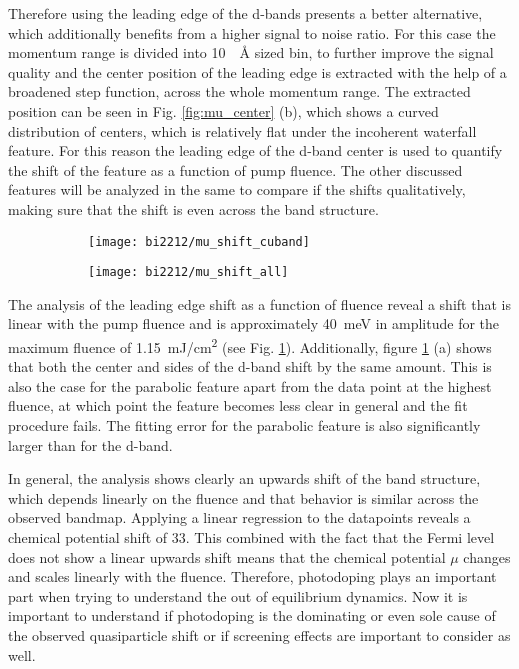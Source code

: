 Therefore using the leading edge of the  d-bands presents a better alternative, which additionally benefits from a higher signal to noise ratio.
For this case the momentum range is divided into \qty{10}{\per\angstrom} sized bin, to further improve the signal quality and the center position of the leading edge is extracted with the help of a broadened step function, across the whole momentum range.
The extracted position can be seen in Fig. \ref{fig:mu_center} (b), which shows a curved distribution of centers, which is relatively flat under the incoherent waterfall feature.
For this reason the leading edge of the  d-band center is used to quantify the shift of the feature as a function of pump fluence.
The other discussed features will be analyzed in the same to compare if the shifts qualitatively, making sure that the shift is even across the band structure.

\begin{figure}[b!]
	\centering
	\begin{subfigure}[b]{0.33\textwidth}
		\texttt{[image: bi2212/mu\_shift\_cuband]}
		\caption{}
	\end{subfigure}
	\begin{subfigure}[b]{0.33\textwidth}
		\texttt{[image: bi2212/mu\_shift\_all]}
		\caption{}
	\end{subfigure}
	\caption{}
	\label{fig:mu_shift}
\end{figure}

The analysis of the leading edge shift as a function of fluence reveal a shift that is linear with the pump fluence and is approximately \qty{40}{\milli\electronvolt} in amplitude for the maximum fluence of \qty{1.15}{\milli\joule/\centi\meter\squared} (see Fig. \ref{fig:mu_shift}).
Additionally, figure \ref{fig:mu_shift} (a) shows that both the center and sides of the  d-band shift by the same amount.
This is also the case for the parabolic feature apart from the data point at the highest fluence, at which point the feature becomes less clear in general and the fit procedure fails.
The fitting error for the parabolic feature is also significantly larger than for the  d-band.

In general, the analysis shows clearly an upwards shift of the band structure, which depends linearly on the fluence and that behavior is similar across the observed bandmap.
Applying a linear regression to the datapoints reveals a chemical potential shift of \qty{33}{\frac{\milli\electronvolt}{\milli\joule/\centi\meter\squared}}.
This combined with the fact that the Fermi level does not show a linear upwards shift means that the chemical potential $\mu$ changes and scales linearly with the fluence.
Therefore, photodoping plays an important part when trying to understand the out of equilibrium dynamics.
Now it is important to understand if photodoping is the dominating or even sole cause of the observed quasiparticle shift or if screening effects are important to consider as well.

